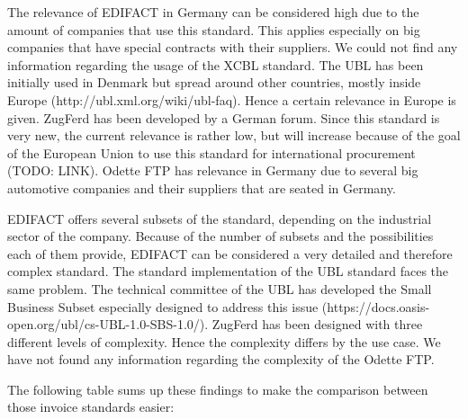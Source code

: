 The relevance of EDIFACT in Germany can be considered high due to the amount of companies that use this standard. This applies especially on big companies that have special contracts with their suppliers. We could not find any information regarding the usage of the XCBL standard. The UBL has been initially used in Denmark but spread around other countries, mostly inside Europe (http://ubl.xml.org/wiki/ubl-faq). Hence a certain relevance in Europe is given. ZugFerd has been developed by a German forum. Since this standard is very new, the current relevance is rather low, but will increase because of the goal of the European Union to use this standard for international procurement (TODO: LINK). Odette FTP has relevance in Germany due to several big automotive companies and their suppliers that are seated in Germany. 

EDIFACT offers several subsets of the standard, depending on the industrial sector of the company. Because of the number of subsets and the possibilities each of them provide, EDIFACT can be considered a very detailed and therefore complex standard. The standard implementation of the UBL standard faces the same problem. The technical committee of the UBL has developed the Small Business Subset especially designed to address this issue (https://docs.oasis-open.org/ubl/cs-UBL-1.0-SBS-1.0/). ZugFerd has been designed with three different levels of complexity. Hence the complexity differs by the use case. We have not found any information regarding the complexity of the Odette FTP.

The following table sums up these findings to make the comparison between those invoice standards easier:

